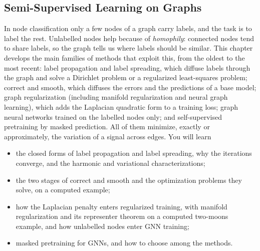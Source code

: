 \begin{notechapter}
\forgetcs\mask{}
\forgetcs\corr{}
\forgetcs\smooth{}
\providecommand{\argmax}{\operatorname*{argmax}}
\providecommand{\argmin}{\operatorname*{argmin}}
\chapter{Semi-Supervised Learning on Graphs}\label{ch:semi-supervised-graphs}

\begin{chapterintro}
In node classification only a few nodes of a graph carry labels, and the task is to label the rest. Unlabelled nodes help because of \emph{homophily}: connected nodes tend to share labels, so the graph tells us where labels should be similar. This chapter develops the main families of methods that exploit this, from the oldest to the most recent: label propagation and label spreading, which diffuse labels through the graph and solve a Dirichlet problem or a regularized least-squares problem; correct and smooth, which diffuses the errors and the predictions of a base model; graph regularization (including manifold regularization and neural graph learning), which adds the Laplacian quadratic form to a training loss; graph neural networks trained on the labelled nodes only; and self-supervised pretraining by masked prediction. All of them minimize, exactly or approximately, the variation of a signal across edges. You will learn
\begin{itemize}[nosep]
  \item the closed forms of label propagation and label spreading, why the iterations converge, and the harmonic and variational characterizations;
  \item the two stages of correct and smooth and the optimization problems they solve, on a computed example;
  \item how the Laplacian penalty enters regularized training, with manifold regularization and its representer theorem on a computed two-moons example, and how unlabelled nodes enter GNN training;
  \item masked pretraining for GNNs, and how to choose among the methods.
\end{itemize}
\end{chapterintro}


\end{notechapter}
